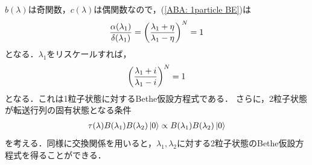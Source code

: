 \documentclass[\main/main.tex]{subfiles}
\begin{document}
\begin{frame}{}
    $b(\lambda)$は奇関数，$c(\lambda)$は偶関数なので，(\ref{ABA: 1particle BE})は
    \begin{align}
        \frac{\alpha(\lambda_1)}{\delta(\lambda_1)} = \qty(\frac{\lambda_1 + \eta}{\lambda_1 - \eta})^{N} = 1
    \end{align}
    となる．$\lambda_1$をリスケールすれば，
    \begin{align}
        \qty(\frac{\lambda_1 + i}{\lambda_1 - i})^N = 1
    \end{align}
    となる．これは1粒子状態に対するBethe仮設方程式である．
    さらに，2粒子状態が転送行列の固有状態となる条件
    \begin{align}
        \tau(\lambda)B(\lambda_1)B(\lambda_2)\ket{0} \propto B(\lambda_1)B(\lambda_2)\ket{0}
    \end{align}
    を考える．同様に交換関係を用いると，$\lambda_1, \lambda_2$に対する2粒子状態のBethe仮設方程式を得ることができる．
\end{frame}
\end{document}
